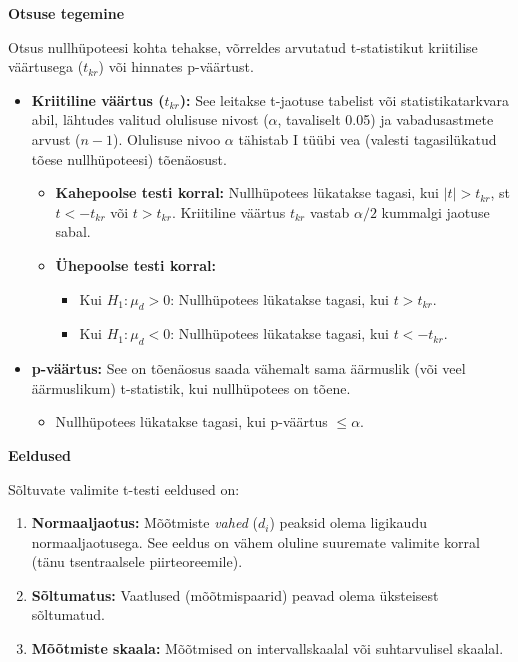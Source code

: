 \documentclass[
]{book}
\providecommand{\tightlist}{%
  \setlength{\itemsep}{0pt}\setlength{\parskip}{0pt}}
\begin{document}
\textbf{Otsuse tegemine}

Otsus nullhüpoteesi kohta tehakse, võrreldes arvutatud t-statistikut kriitilise väärtusega (\(t_{kr}\)) või hinnates p-väärtust.

\begin{itemize}
\tightlist
\item
  \textbf{Kriitiline väärtus (\(t_{kr}\)):} See leitakse t-jaotuse tabelist või statistikatarkvara abil, lähtudes valitud olulisuse nivost (\(\alpha\), tavaliselt 0.05) ja vabadusastmete arvust (\(n-1\)). Olulisuse nivoo \(\alpha\) tähistab I tüübi vea (valesti tagasilükatud tõese nullhüpoteesi) tõenäosust.

  \begin{itemize}
  \tightlist
  \item
    \textbf{Kahepoolse testi korral:} Nullhüpotees lükatakse tagasi, kui \(|t| > t_{kr}\), st \(t < -t_{kr}\) või \(t > t_{kr}\). Kriitiline väärtus \(t_{kr}\) vastab \(\alpha/2\) kummalgi jaotuse sabal.
  \item
    \textbf{Ühepoolse testi korral:}

    \begin{itemize}
    \tightlist
    \item
      Kui \(H_1: \mu_d > 0\): Nullhüpotees lükatakse tagasi, kui \(t > t_{kr}\).
    \item
      Kui \(H_1: \mu_d < 0\): Nullhüpotees lükatakse tagasi, kui \(t < -t_{kr}\).
    \end{itemize}
  \end{itemize}
\item
  \textbf{p-väärtus:} See on tõenäosus saada vähemalt sama äärmuslik (või veel äärmuslikum) t-statistik, kui nullhüpotees on tõene.

  \begin{itemize}
  \tightlist
  \item
    Nullhüpotees lükatakse tagasi, kui p-väärtus \(\leq \alpha\).
  \end{itemize}
\end{itemize}

\textbf{Eeldused}

Sõltuvate valimite t-testi eeldused on:

\begin{enumerate}
\def\labelenumi{\arabic{enumi}.}
\tightlist
\item
  \textbf{Normaaljaotus:} Mõõtmiste \emph{vahed} (\(d_i\)) peaksid olema ligikaudu normaaljaotusega. See eeldus on vähem oluline suuremate valimite korral (tänu tsentraalsele piirteoreemile).
\item
  \textbf{Sõltumatus:} Vaatlused (mõõtmispaarid) peavad olema üksteisest sõltumatud.
\item
  \textbf{Mõõtmiste skaala:} Mõõtmised on intervallskaalal või suhtarvulisel skaalal.
\end{enumerate}
\end{document}
